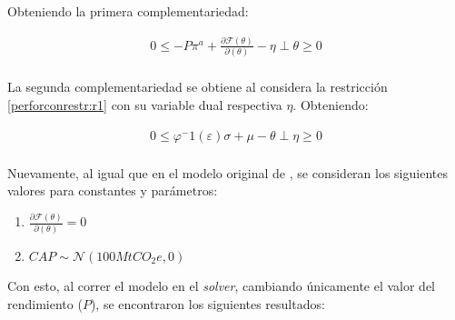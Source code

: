 Obteniendo la primera complementariedad:

\begin{equation}
\begin{array}{rrclcl}
    0\leq -P\pi^a+\frac{\partial\mathcal{F}(\theta)}{\partial(\theta)}-\eta \perp \theta \geq 0 \label{compllag2}\\
\end{array}
\end{equation}

La segunda complementariedad se obtiene al considera la restricción \ref{perforconrestr:r1} con su variable dual respectiva $\eta$. Obteniendo:

\begin{equation}
\begin{array}{rrclcl}
    0 \leq \varphi^-1 (\varepsilon )\sigma + \mu - \theta \perp \eta \geq 0 \label{compllag2}\\
\end{array}
\end{equation}

Nuevamente, al igual que en el modelo original de , se consideran los siguientes valores para constantes y parámetros:
\begin{enumerate}
    \item $\frac{\partial\mathcal{F}(\theta)}{\partial(\theta)}=0$
    \item $CAP\sim \mathcal{N}(100MtCO_{2}e,0)$
\end{enumerate}

Con esto, al correr el modelo en el \textit{solver}, cambiando únicamente el valor del rendimiento ($P$), se encontraron los siguientes resultados:

